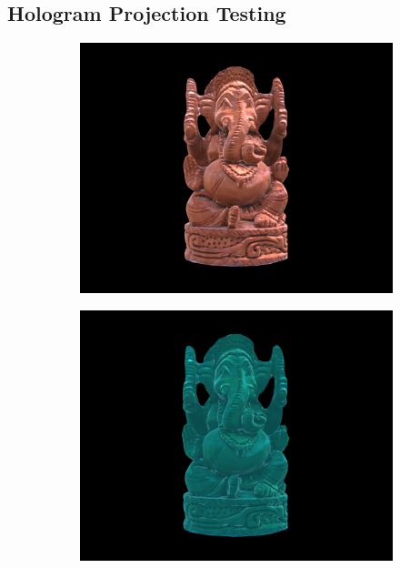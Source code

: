 \documentclass[conference]{IEEEtran}
\begin{document}
	\subsection{Hologram Projection Testing} 
		\vspace{-2ex}
		\begin{figure}[h]
			\begin{center}
				\begin{subfigure}[t]{0.11\textwidth}
					\includegraphics[width=\textwidth]{img/ilusi1.png}
					\caption{\label{fig:ilusi1}}
				\end{subfigure}
				\hspace{0.05em}
				\begin{subfigure}[t]{0.11\textwidth}
					\includegraphics[width=\textwidth]{img/ilusi2.png}

\end{subfigure}
\end{center}
\end{figure}
\end{document}
